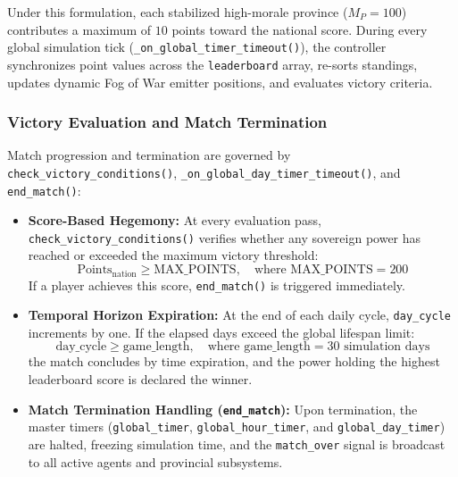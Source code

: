 Under this formulation, each stabilized high-morale province ($M_P = 100$) contributes a maximum of $10$ points toward the national score. During every global simulation tick (\texttt{\_on\_global\_timer\_timeout()}), the controller synchronizes point values across the \texttt{leaderboard} array, re-sorts standings, updates dynamic Fog of War emitter positions, and evaluates victory criteria.

\subsubsection{Victory Evaluation and Match Termination}
Match progression and termination are governed by \texttt{check\_victory\_conditions()}, \texttt{\_on\_global\_day\_timer\_timeout()}, and \texttt{end\_match()}:

\begin{itemize}
    \item \textbf{Score-Based Hegemony:} At every evaluation pass, \texttt{check\_victory\_conditions()} verifies whether any sovereign power has reached or exceeded the maximum victory threshold:
    \begin{equation}
        \text{Points}_{\text{nation}} \ge \text{MAX\_POINTS}, \quad \text{where } \text{MAX\_POINTS} = 200
    \end{equation}
    If a player achieves this score, \texttt{end\_match()} is triggered immediately.
    \item \textbf{Temporal Horizon Expiration:} At the end of each daily cycle, \texttt{day\_cycle} increments by one. If the elapsed days exceed the global lifespan limit:
    \begin{equation}
        \text{day\_cycle} \ge \text{game\_length}, \quad \text{where } \text{game\_length} = 30 \text{ simulation days}
    \end{equation}
    the match concludes by time expiration, and the power holding the highest leaderboard score is declared the winner.
    \item \textbf{Match Termination Handling (\texttt{end\_match}):} Upon termination, the master timers (\texttt{global\_timer}, \texttt{global\_hour\_timer}, and \texttt{global\_day\_timer}) are halted, freezing simulation time, and the \texttt{match\_over} signal is broadcast to all active agents and provincial subsystems.
\end{itemize}

